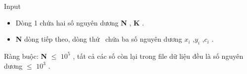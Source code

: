 Input
\begin{itemize}
	\item     Dòng 1 chứa hai số nguyên dương    \textbf{     N    }    ,    \textbf{     K    }    .   
	\item \textbf{     N    }    dòng tiếp theo, dòng thứ     chứa ba số nguyên dương $x_{i}$    ,$y_{i}$    ,$c_{i}$    .   
\end{itemize}

   Ràng buộc:   \textbf{    N   }    $\le$ $10^{5}$   , tất cả các số còn lại trong file dữ liệu đều là số nguyên dương  $\le$ $10^{3}$   .